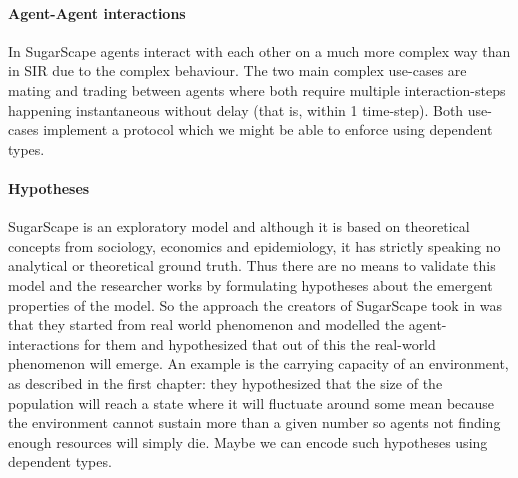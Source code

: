 \paragraph{Agent-Agent interactions}
In SugarScape agents interact with each other on a much more complex way than in SIR due to the complex behaviour. The two main complex use-cases are mating and trading between agents where both require multiple interaction-steps happening instantaneous without delay (that is, within 1 time-step). Both use-cases implement a protocol which we might be able to enforce using dependent types.

\paragraph{Hypotheses}
SugarScape is an exploratory model and although it is based on theoretical concepts from sociology, economics and epidemiology, it has strictly speaking no analytical or theoretical ground truth. Thus there are no means to validate this model and the researcher works by formulating hypotheses about the emergent properties of the model. So the approach the creators of SugarScape took in \cite{epstein_growing_1996} was that they started from real world phenomenon and modelled the agent-interactions for them and hypothesized that out of this the real-world phenomenon will emerge. An example is the carrying capacity of an environment, as described in the first chapter: they hypothesized that the size of the population will reach a state where it will fluctuate around some mean because the environment cannot sustain more than a given number so agents not finding enough resources will simply die. Maybe we can encode such hypotheses using dependent types.
